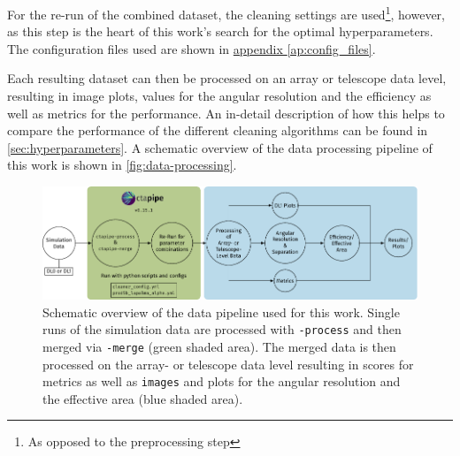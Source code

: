For the re-run of the combined dataset, the cleaning settings are used\footnote{As opposed to the preprocessing step},
however, as this step is the heart of this work's search for the optimal hyperparameters.
The configuration files used are shown in \hyperref[ap:config_files]{appendix \ref{ap:config_files}}.

Each resulting dataset can then be processed on an array or telescope data level, resulting in
\dloa{} image plots, values for the angular resolution and the efficiency as well as metrics for the
performance. An in-detail description of how this helps to compare the performance of the different
cleaning algorithms can be found in \autoref{sec:hyperparameters}. A schematic overview of the data
processing pipeline of this work is shown in \autoref{fig:data-processing}.

\begin{figure}
    \centering
    \includegraphics[width=\textwidth]{graphics/data_pipeline.pdf}
    \caption{Schematic overview of the data pipeline used for this work. Single runs of the simulation
    data are processed with \ctapipe\texttt{-process} and then merged via \ctapipe\texttt{-merge} (green shaded area).
    The merged data is then processed on the array- or telescope data level resulting in scores for metrics
    as well as \dlo{} \texttt{images} and plots for the angular resolution and the effective area (blue shaded area).}
    \label{fig:data-processing}
\end{figure}


